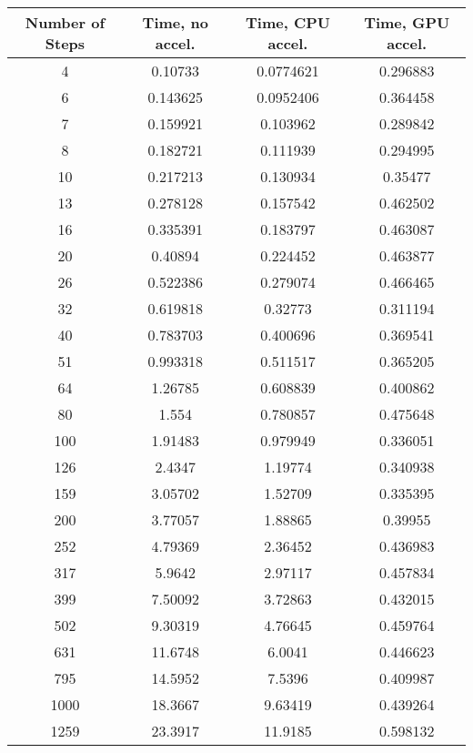 \begin{table}[ht]
    \centering
    {\footnotesize
        \begin{tabular}{| c | c c c |}
            \hline
            Number of Steps  & Time, no accel.  & Time, CPU accel. &  Time, GPU accel. \\
            \hline
            4 & 0.10733  & 0.0774621 & 0.296883 \\
            6 & 0.143625 & 0.0952406 & 0.364458 \\
            7 & 0.159921 & 0.103962  & 0.289842 \\
            8 & 0.182721 & 0.111939  & 0.294995 \\
            10 & 0.217213 & 0.130934  & 0.35477 \\
            13 & 0.278128 & 0.157542  & 0.462502 \\
            16 & 0.335391 & 0.183797  & 0.463087 \\ 
            20 & 0.40894  & 0.224452  & 0.463877 \\ 
            26 & 0.522386 & 0.279074  & 0.466465 \\
            32 & 0.619818 & 0.32773  & 0.311194 \\
            40 & 0.783703 & 0.400696 & 0.369541 \\
            51 & 0.993318 & 0.511517 & 0.365205 \\
            64 & 1.26785  & 0.608839 & 0.400862 \\
            80 & 1.554    & 0.780857 & 0.475648 \\
        100 & 1.91483  & 0.979949 & 0.336051 \\
        126 & 2.4347   & 1.19774  & 0.340938 \\
        159 & 3.05702  & 1.52709  & 0.335395 \\
        200 & 3.77057  & 1.88865  & 0.39955 \\
        252 & 4.79369  & 2.36452  & 0.436983 \\
        317 &  5.9642  &  2.97117 & 0.457834 \\
        399 &  7.50092 &  3.72863 & 0.432015 \\
        502 &  9.30319 &  4.76645 & 0.459764 \\ 
        631 & 11.6748  &  6.0041  & 0.446623 \\
        795 & 14.5952  &  7.5396  & 0.409987 \\ 
        1000 & 18.3667  &  9.63419 & 0.439264 \\
        1259 & 23.3917  & 11.9185  & 0.598132 \\ 

\end{tabular}}
\end{table}
